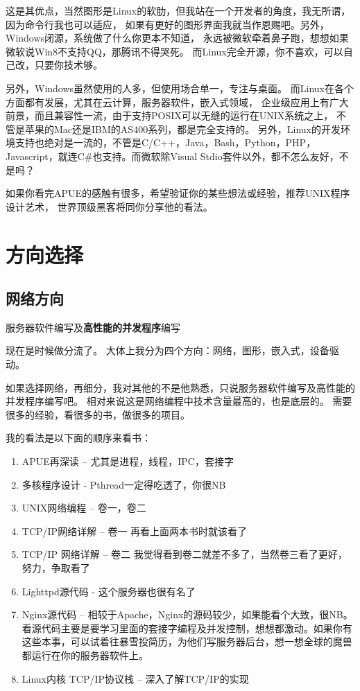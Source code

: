 \documentclass[UTF8,a4paper,12pt]{ctexbook}
\begin{document}
			这是其优点，当然图形是Linux的软肋，但我站在一个开发者的角度，我无所谓，因为命令行我也可以适应， 如果有更好的图形界面我就当作恩赐吧。另外，Windows闭源，系统做了什么你更本不知道， 永远被微软牵着鼻子跑，想想如果微软说Win8不支持QQ，那腾讯不得哭死。 而Linux完全开源，你不喜欢，可以自己改，只要你技术够。
			
			另外，Windows虽然使用的人多，但使用场合单一，专注与桌面。 而Linux在各个方面都有发展，尤其在云计算，服务器软件，嵌入式领域， 企业级应用上有广大前景，而且兼容性一流，由于支持POSIX可以无缝的运行在UNIX系统之上， 不管是苹果的Mac还是IBM的AS400系列，都是完全支持的。 另外，Linux的开发环境支持也绝对是一流的，不管是C/C++，Java，Bash，Python，PHP，Javascript，就连C\#也支持。而微软除Visual Stdio套件以外，都不怎么友好，不是吗？
			
			如果你看完APUE的感触有很多，希望验证你的某些想法或经验，推荐UNIX程序设计艺术， 世界顶级黑客将同你分享他的看法。

	\section{方向选择}			
		\subsection{网络方向}
			服务器软件编写及\textbf{高性能的并发程序}编写
			
			现在是时候做分流了。 大体上我分为四个方向：网络，图形，嵌入式，设备驱动。
			
			如果选择网络，再细分，我对其他的不是他熟悉，只说服务器软件编写及高性能的并发程序编写吧。 相对来说这是网络编程中技术含量最高的，也是底层的。 需要很多的经验，看很多的书，做很多的项目。
			
			我的看法是以下面的顺序来看书：
			\begin{enumerate}
				\item APUE再深读 – 尤其是进程，线程，IPC，套接字
				\item 多核程序设计 - Pthread一定得吃透了，你很NB
				\item UNIX网络编程 – 卷一，卷二
				\item TCP/IP网络详解 – 卷一 再看上面两本书时就该看了
				\item TCP/IP 网络详解 – 卷二 我觉得看到卷二就差不多了，当然卷三看了更好，努力，争取看了
				\item Lighttpd源代码 - 这个服务器也很有名了
				\item Nginx源代码 – 相较于Apache，Nginx的源码较少，如果能看个大致，很NB。看源代码主要是要学习里面的套接字编程及并发控制，想想都激动。如果你有这些本事，可以试着往暴雪投简历，为他们写服务器后台，想一想全球的魔兽都运行在你的服务器软件上。
				\item Linux内核 TCP/IP协议栈 – 深入了解TCP/IP的实现
			\end{enumerate}
			
\end{document}
